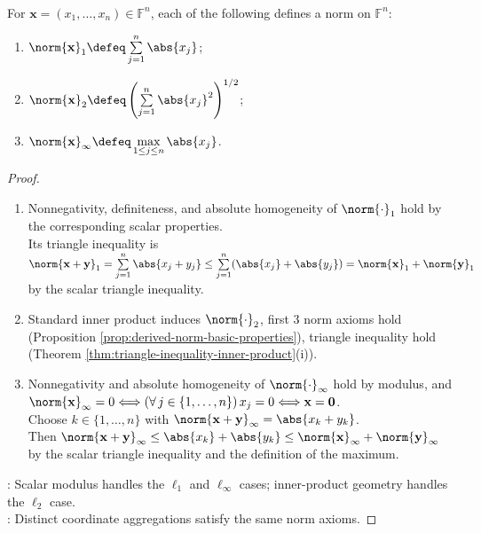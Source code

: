 \begin{proposition} \label{prop:coordinate-norms-on-fn} \\
For $\mathbf{x}=(x_1,\ldots,x_n)\in\mathbb{F}^n$, each of the following defines a norm on $\mathbb{F}^n$:
\begin{enumerate}[label=(\roman*)]
\setlength{\itemsep}{0pt}
\item $\norm{\mathbf{x}}_1\defeq\sum\limits_{j=1}^{n}\abs{x_j}$;
\item $\norm{\mathbf{x}}_2\defeq\left(\sum\limits_{j=1}^{n}\abs{x_j}^2\right)^{1/2}$;
\item $\norm{\mathbf{x}}_{\infty}\defeq\max\limits_{1\leq j\leq n}\abs{x_j}$.
\end{enumerate}
\begin{proof}
\begin{enumerate}[label=(\roman*)]
\setlength{\itemsep}{0pt}
\item Nonnegativity, definiteness, and absolute homogeneity of $\norm{\cdot}_1$ hold by the corresponding scalar properties.\\
Its triangle inequality is $\norm{\mathbf{x}+\mathbf{y}}_1=\sum\limits_{j=1}^{n}\abs{x_j+y_j}\leq\sum\limits_{j=1}^{n}(\abs{x_j}+\abs{y_j})=\norm{\mathbf{x}}_1+\norm{\mathbf{y}}_1$ by the scalar triangle inequality.
\item Standard inner product induces $\norm{\cdot}_2$, first $3$ norm axioms hold  (Proposition \ref{prop:derived-norm-basic-properties}), triangle inequality hold  (Theorem \ref{thm:triangle-inequality-inner-product}(i)).
\item Nonnegativity and absolute homogeneity of $\norm{\cdot}_{\infty}$ hold by modulus, and $\norm{\mathbf{x}}_{\infty}=0\Longleftrightarrow(\forall\,j\in\{1,\ldots,n\})\,x_j=0\Longleftrightarrow\mathbf{x}=\mathbf{0}$.\\
Choose $k\in\{1,\ldots,n\}$ with $\norm{\mathbf{x}+\mathbf{y}}_{\infty}=\abs{x_k+y_k}$.\\
Then $\norm{\mathbf{x}+\mathbf{y}}_{\infty}\leq\abs{x_k}+\abs{y_k}\leq\norm{\mathbf{x}}_{\infty}+\norm{\mathbf{y}}_{\infty}$ by the scalar triangle inequality and the definition of the maximum.
\end{enumerate}
: Scalar modulus handles the $\ell_1$ and $\ell_\infty$ cases; inner-product geometry handles the $\ell_2$ case.\\
: Distinct coordinate aggregations satisfy the same norm axioms.
\end{proof}
\end{proposition}

